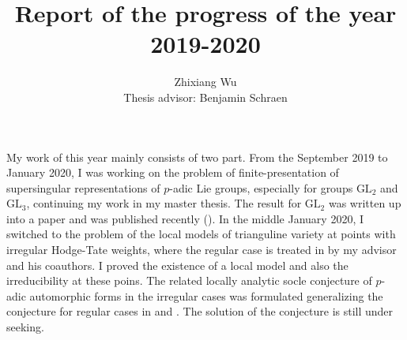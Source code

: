 \documentclass{amsart}
\title{Report of the progress of the year 2019-2020}
\author{Zhixiang Wu\\ Thesis advisor: Benjamin Schraen}
\date{}
\newcommand{\GL}{\text{GL}}
\numberwithin{equation}{section}
\begin{document}
\maketitle
My work of this year mainly consists of two part. From the September 2019 to January 2020, I was working on the problem of finite-presentation of supersingular representations of $p$-adic Lie groups, especially for groups $\GL_2$ and $\GL_3$, continuing my work in my master thesis. The result for $\GL_2$ was written up into a paper and was published recently (\cite{wu2020supersingular}). In the middle January 2020, I switched to the problem of the local models of trianguline variety at points with irregular Hodge-Tate weights, where the regular case is treated in \cite{breuil2019local} by my advisor and his coauthors. I proved the existence of a local model and also the irreducibility at these poins. The related locally analytic socle conjecture of $p$-adic automorphic forms in the irregular cases was formulated generalizing the conjecture for regular cases in \cite{breuil2016versI} and \cite{breuil2015versII}. The solution of the conjecture is still under seeking.
\end{document}
